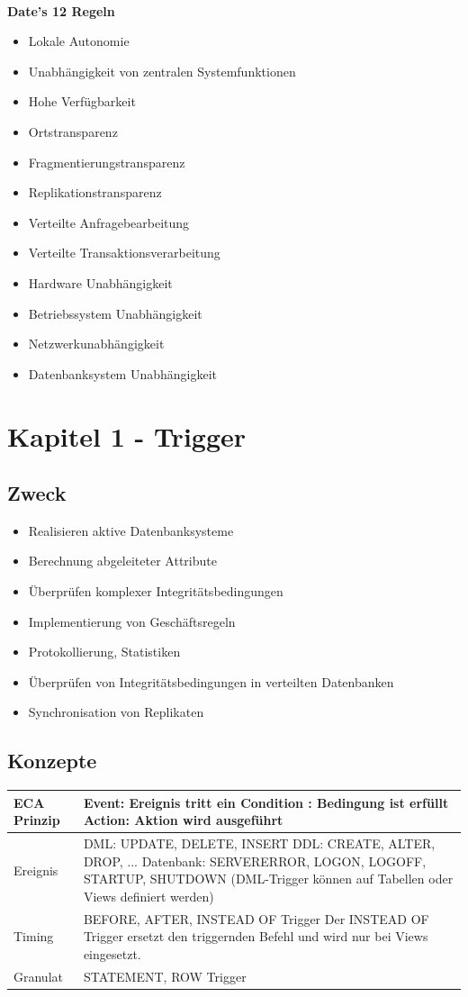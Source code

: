 \documentclass[a4paper,11pt]{article}
\begin{document}
\\
\textbf{Date's 12 Regeln}
\begin{itemize}
\item Lokale Autonomie
\item Unabhängigkeit von zentralen Systemfunktionen
\item Hohe Verfügbarkeit
\item Ortstransparenz
\item Fragmentierungstransparenz
\item Replikationstransparenz
\item Verteilte Anfragebearbeitung
\item Verteilte Transaktionsverarbeitung
\item Hardware Unabhängigkeit
\item Betriebssystem Unabhängigkeit
\item Netzwerkunabhängigkeit
\item Datenbanksystem Unabhängigkeit
\end{itemize}
\section{Kapitel 1 - Trigger}
\subsection{Zweck}
\begin{itemize}
\item Realisieren aktive Datenbanksysteme
\item Berechnung abgeleiteter Attribute
\item Überprüfen komplexer Integritätsbedingungen
\item Implementierung von Geschäftsregeln
\item Protokollierung, Statistiken
\item Überprüfen von Integritätsbedingungen in verteilten Datenbanken
\item Synchronisation von Replikaten
\end{itemize}
\subsection{Konzepte}
\begin{tabular}{| p{5cm} | p{10cm} |}
\hline
ECA Prinzip &
Event: Ereignis tritt ein\newline
Condition : Bedingung ist erfüllt\newline
Action: Aktion wird ausgeführt\\ \hline
Ereignis &
DML: UPDATE, DELETE, INSERT\newline
DDL: CREATE, ALTER, DROP, ...\newline
Datenbank: SERVERERROR, LOGON, LOGOFF, STARTUP, SHUTDOWN\newline
(DML-Trigger können auf Tabellen oder Views definiert werden)\\ \hline
Timing & BEFORE, AFTER, INSTEAD OF Trigger\newline
Der INSTEAD OF Trigger ersetzt den triggernden Befehl und wird nur bei Views eingesetzt.\\ \hline
Granulat & STATEMENT, ROW Trigger\\ \hline
\end{tabular}
\end{document}
